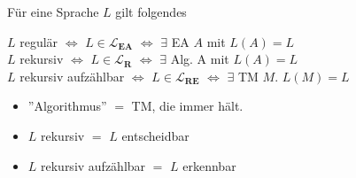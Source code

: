     
    

        Für eine Sprache $L$ gilt folgendes
        \begin{center}
            $L$ regulär $\iff $ $L \in \mathbf{\mathcal{L}_{\textbf{EA}}}$ $\iff$ $\exists$ EA $A$ mit $L(A) = L$\\
            $L$ rekursiv $\iff$ $L \in \mathbf{\mathcal{L}_{\textbf{R}}}$ $\iff$ $\exists$ Alg. A mit $L(A) = L$\\
            $L$ rekursiv aufzählbar $\iff$ $L \in \mathbf{\mathcal{L}_{\textbf{RE}}}$ $\iff$ $\exists$ TM $M$. $L(M) = L$
        \end{center}
        \begin{itemize}
            \item  ''Algorithmus'' $=$ TM, die immer hält.
            \item $L$ rekursiv $=$ $L$ entscheidbar
            \item $L$ rekursiv aufzählbar $=$ $L$ erkennbar
        \end{itemize}
       